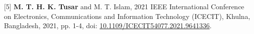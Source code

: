 {{[5] \textbf{M. T. H. K. Tusar} and M. T. Islam,  2021 IEEE International Conference on Electronics, Communications and Information Technology (ICECIT), Khulna, Bangladesh, 2021, pp. 1-4, doi: \href{https://www.doi.org/10.1109/ICECIT54077.2021.9641336}{\textcolor{Cerulean}{10.1109/ICECIT54077.2021.9641336}}.

}}